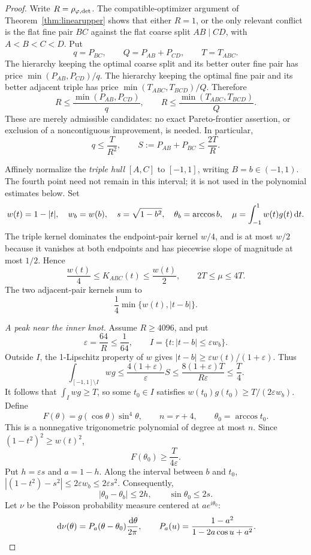 \begin{proof}
Write $R=\rho_{\varphi,\mathrm{det}}$. The compatible-optimizer argument of Theorem~\ref{thm:linearupper} shows that either $R=1$, or the only relevant conflict is the flat fine pair $BC$ against the flat coarse split $AB\mid CD$, with $A<B<C<D$. Put
\[
q=P_{BC},\qquad Q=P_{AB}+P_{CD},\qquad T=T_{ABC}.
\]
The hierarchy keeping the optimal coarse split and its better outer fine pair has price $\min(P_{AB},P_{CD})/q$. The hierarchy keeping the optimal fine pair and its better adjacent triple has price $\min(T_{ABC},T_{BCD})/Q$. Therefore
\[
R\le\frac{\min(P_{AB},P_{CD})}{q},\qquad
R\le\frac{\min(T_{ABC},T_{BCD})}{Q}.
\]
These are merely admissible candidates: no exact Pareto-frontier assertion, or exclusion of a noncontiguous improvement, is needed. In particular,
\begin{equation}
q\le \frac{T}{R^2},\qquad
S:=P_{AB}+P_{BC}\le\frac{2T}{R}.
\label{eq:logbothratios}
\end{equation}

Affinely normalize the \emph{triple hull} $[A,C]$ to $[-1,1]$, writing $B=b\in(-1,1)$. The fourth point need not remain in this interval; it is not used in the polynomial estimates below. Set
\[
w(t)=1-|t|,\quad w_b=w(b),\quad
s=\sqrt{1-b^2},\quad \theta_b=\arccos b,\quad
\mu=\int_{-1}^1w(t)g(t)\,\mathrm d t.
\]
The triple kernel dominates the endpoint-pair kernel $w/4$, and is at most $w/2$ because it vanishes at both endpoints and has piecewise slope of magnitude at most $1/2$. Hence
\begin{equation}
\frac{w(t)}4\le K_{ABC}(t)\le\frac{w(t)}2,
\qquad 2T\le\mu\le4T.
\label{eq:logtriplekernel}
\end{equation}
The two adjacent-pair kernels sum to
\[
\frac14\min\{w(t),|t-b|\}.
\]

\emph{A peak near the inner knot.}
Assume $R\ge4096$, and put
\[
\varepsilon=\frac{64}{R}\le\frac1{64},\qquad
I=\{t:|t-b|\le\varepsilon w_b\}.
\]
Outside $I$, the 1-Lipschitz property of $w$ gives
$|t-b|\ge\varepsilon w(t)/(1+\varepsilon)$. Thus
\[
\int_{[-1,1]\setminus I}wg
\le\frac{4(1+\varepsilon)}{\varepsilon}S
\le\frac{8(1+\varepsilon)T}{R\varepsilon}
\le\frac T4.
\]
It follows that $\int_Iwg\ge T$, so some $t_0\in I$ satisfies
$w(t_0)g(t_0)\ge T/(2\varepsilon w_b)$. Define
\[
F(\theta)=g(\cos\theta)\sin^4\theta,\qquad
n=r+4,\qquad \theta_0=\arccos t_0.
\]
This is a nonnegative trigonometric polynomial of degree at most $n$. Since $(1-t^2)^2\ge w(t)^2$,
\begin{equation}
F(\theta_0)\ge\frac{T}{4\varepsilon}.
\label{eq:logpeak}
\end{equation}
Put $h=\varepsilon s$ and $a=1-h$. Along the interval between $b$ and $t_0$,
$|(1-t^2)-s^2|\le2\varepsilon w_b\le2\varepsilon s^2$. Consequently,
\begin{equation}
|\theta_0-\theta_b|\le2h,\qquad \sin\theta_0\le2s.
\label{eq:logangles}
\end{equation}
Let $\nu$ be the Poisson probability measure centered at $ae^{i\theta_0}$:
\[
\,\mathrm d\nu(\theta)=P_a(\theta-\theta_0)\frac{\,\mathrm d\theta}{2\pi},
\qquad
P_a(u)=\frac{1-a^2}{1-2a\cos u+a^2}.
\]


\end{proof}
